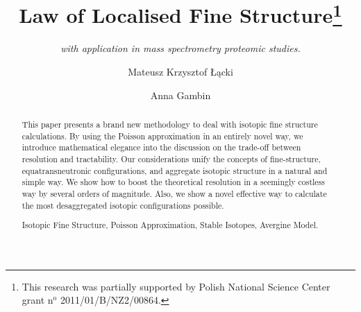 \documentclass[runningheads,a4paper]{llncs}
\newcommand{\keywords}[1]{\par\addvspace\baselineskip
\noindent\keywordname\enspace\ignorespaces#1}
\begin{document}
\mainmatter  

\title{Law of Localised Fine Structure\thanks{
	This research was partially supported by Polish National Science Center grant $\text{n}^\text{o}$ 2011/01/B/NZ2/00864.
}}

\subtitle{\textit{with application in mass spectrometry proteomic studies.}}


\author{Mateusz Krzysztof \L\k{a}cki
\and Anna Gambin}





\maketitle

\begin{abstract}
	This paper presents a brand new methodology to deal with isotopic fine structure calculations. By using the Poisson approximation in an entirely novel way, we introduce mathematical elegance into the discussion on the trade-off between resolution and tractability. Our considerations unify the concepts of fine-structure, equatransneutronic configurations, and aggregate isotopic structure in a natural and simple way. We show how to boost the theoretical resolution in a seemingly costless way by several orders of magnitude. Also, we show a novel effective way to calculate the most desaggregated isotopic configurations possible.
\keywords{Isotopic Fine Structure, Poisson Approximation, Stable Isotopes, Avergine Model.}
\end{abstract}









  
  




\end{document}

